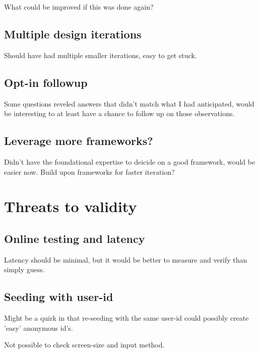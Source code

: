 \documentclass[nofilelist,dvipsnames]{cslthse-msc}
\begin{document}
{        What could be improved if this was done again?

        \subsection{Multiple design iterations}

          Should have had multiple smaller iterations, easy to get stuck.

        \subsection{Opt-in followup}

          Some questions reveled answers that didn't match what I had
          anticipated, would be interesting to at least have a chance to follow
          up on those observations.

        \subsection{Leverage more frameworks?}

          Didn't have the foundational expertise to deicide on a good
          framework, would be easier now.
          Build upon frameworks for faster iteration?

			\section{Threats to validity}

        \subsection{Online testing and latency}

          Latency should be minimal, but it would be better to measure and
          verify than simply guess.

        \subsection{Seeding with user-id}

          Might be a quirk in that re-seeding with the same user-id could
          possibly create 'easy' anonymous id's.

        Not possible to check screen-size and input method.






}
\end{document}
